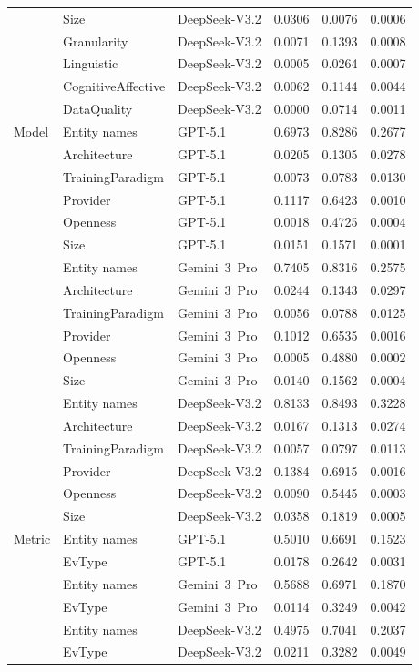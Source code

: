 \begin{tabular}{lllrrr}
 & Size & DeepSeek-V3.2 & 0.0306 & 0.0076 & 0.0006 \\
 & Granularity & DeepSeek-V3.2 & 0.0071 & 0.1393 & 0.0008 \\
 & Linguistic & DeepSeek-V3.2 & 0.0005 & 0.0264 & 0.0007 \\
 & CognitiveAffective & DeepSeek-V3.2 & 0.0062 & 0.1144 & 0.0044 \\
 & DataQuality & DeepSeek-V3.2 & 0.0000 & 0.0714 & 0.0011 \\
Model & Entity names & GPT-5.1 & 0.6973 & 0.8286 & 0.2677 \\
 & Architecture & GPT-5.1 & 0.0205 & 0.1305 & 0.0278 \\
 & TrainingParadigm & GPT-5.1 & 0.0073 & 0.0783 & 0.0130 \\
 & Provider & GPT-5.1 & 0.1117 & 0.6423 & 0.0010 \\
 & Openness & GPT-5.1 & 0.0018 & 0.4725 & 0.0004 \\
 & Size & GPT-5.1 & 0.0151 & 0.1571 & 0.0001 \\
 & Entity names & Gemini~3~Pro & 0.7405 & 0.8316 & 0.2575 \\
 & Architecture & Gemini~3~Pro & 0.0244 & 0.1343 & 0.0297 \\
 & TrainingParadigm & Gemini~3~Pro & 0.0056 & 0.0788 & 0.0125 \\
 & Provider & Gemini~3~Pro & 0.1012 & 0.6535 & 0.0016 \\
 & Openness & Gemini~3~Pro & 0.0005 & 0.4880 & 0.0002 \\
 & Size & Gemini~3~Pro & 0.0140 & 0.1562 & 0.0004 \\
 & Entity names & DeepSeek-V3.2 & 0.8133 & 0.8493 & 0.3228 \\
 & Architecture & DeepSeek-V3.2 & 0.0167 & 0.1313 & 0.0274 \\
 & TrainingParadigm & DeepSeek-V3.2 & 0.0057 & 0.0797 & 0.0113 \\
 & Provider & DeepSeek-V3.2 & 0.1384 & 0.6915 & 0.0016 \\
 & Openness & DeepSeek-V3.2 & 0.0090 & 0.5445 & 0.0003 \\
 & Size & DeepSeek-V3.2 & 0.0358 & 0.1819 & 0.0005 \\
Metric & Entity names & GPT-5.1 & 0.5010 & 0.6691 & 0.1523 \\
 & EvType & GPT-5.1 & 0.0178 & 0.2642 & 0.0031 \\
 & Entity names & Gemini~3~Pro & 0.5688 & 0.6971 & 0.1870 \\
 & EvType & Gemini~3~Pro & 0.0114 & 0.3249 & 0.0042 \\
 & Entity names & DeepSeek-V3.2 & 0.4975 & 0.7041 & 0.2037 \\
 & EvType & DeepSeek-V3.2 & 0.0211 & 0.3282 & 0.0049 \\
\bottomrule
\end{tabular}